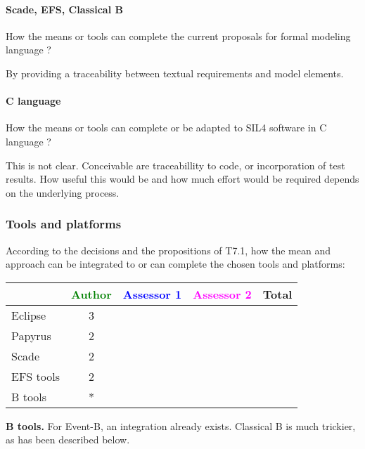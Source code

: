 \paragraph{Scade, EFS, Classical B}
How the means or tools can complete the current proposals for formal modeling language ?

\begin{author_comment}
By providing a traceability between textual requirements and model elements.
\end{author_comment}

\paragraph{C language}
How the means or tools can complete or be adapted to SIL4 software in C language ?

\begin{author_comment}
This is not clear.  Conceivable are traceabillity to code, or incorporation of test results.  How useful this would be and how much effort would be required depends on the underlying process.
\end{author_comment}

\subsubsection{Tools and platforms}

According to the decisions and the propositions of T7.1, how the mean and approach can be integrated to or can complete the chosen tools and platforms:

\begin{tabular}{|l | c | c | c | c|}
\hline
& \textcolor{green}{Author} & \textcolor{blue}{Assessor 1} & \textcolor{magenta}{Assessor 2} & Total \\
\hline 
Eclipse & 3 & & &  \\
\hline
Papyrus  & 2 & & & \\
\hline
Scade & 2 & & & \\
\hline
EFS tools & 2 & & & \\
\hline
B tools & * & & & \\
\hline
\end{tabular}

\begin{author_comment}
\textbf{B tools.} For Event-B, an integration already exists.  Classical B is much trickier, as has been described below.
\end{author_comment}

